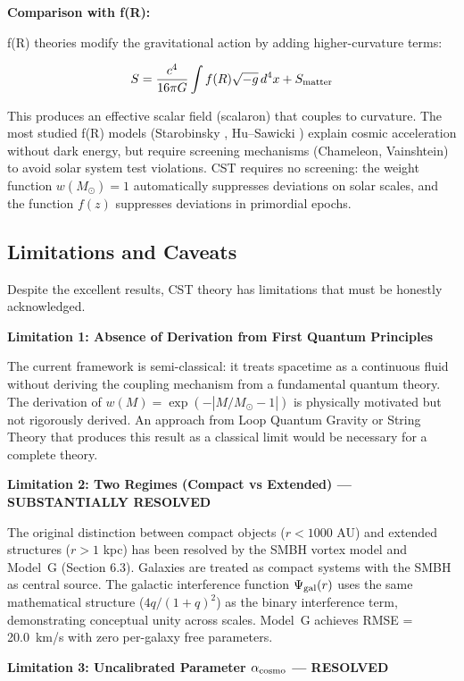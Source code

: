 \documentclass[10pt,a4paper]{article}
\begin{document}
\textbf{Comparison with f(R):}

f(R) theories modify the gravitational action by adding higher-curvature
terms:

\[S = \frac{c^4}{16\pi G}\int f(R)\sqrt{-g}\,d^4x + S_{\rm matter}\]

This produces an effective scalar field (scalaron) that couples to
curvature. The most studied f(R) models (Starobinsky \cite{Starobinsky1980}, Hu--Sawicki \cite{Hu2007})
explain cosmic acceleration without dark energy, but require screening
mechanisms (Chameleon, Vainshtein) to avoid solar system test
violations. CST requires no screening: the weight function
\(w(M_\odot) = 1\) automatically suppresses deviations on solar scales,
and the function \(f(z)\) suppresses deviations in primordial epochs.

\subsection{Limitations and
Caveats}\label{limitations-and-caveats}

Despite the excellent results, CST theory has limitations that must be
honestly acknowledged.

\textbf{Limitation 1: Absence of Derivation from First Quantum
Principles}

The current framework is semi-classical: it treats spacetime as a
continuous fluid without deriving the coupling mechanism from a
fundamental quantum theory. The derivation of
\(w(M) = \exp(-|M/M_\odot - 1|)\) is physically motivated but not
rigorously derived. An approach from Loop Quantum Gravity or String
Theory that produces this result as a classical limit would be necessary
for a complete theory.

\textbf{Limitation 2: Two Regimes (Compact vs Extended) --- SUBSTANTIALLY RESOLVED}

The original distinction between compact objects (\(r < 1000\) AU) and extended structures (\(r > 1\) kpc) has been resolved by the SMBH vortex model and Model~G (Section 6.3). Galaxies are treated as compact systems with the SMBH as central source. The galactic interference function \(\Psi_{\rm gal}(r)\) uses the same mathematical structure (\(4q/(1+q)^2\)) as the binary interference term, demonstrating conceptual unity across scales. Model~G achieves RMSE = 20.0~km/s with zero per-galaxy free parameters.

\textbf{Limitation 3: Uncalibrated Parameter \(\alpha_{\rm cosmo}\) --- RESOLVED}
\end{document}
